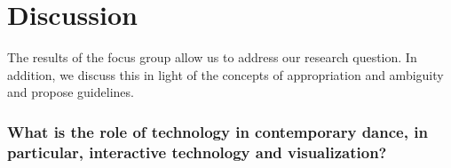 


\section{Discussion}

The results of the focus group allow us to address our research question. In addition, we  discuss this in light of the concepts of appropriation and ambiguity and propose guidelines.

\subsubsection{{ \textbf{What is the role of technology in contemporary dance, in particular, interactive technology and visualization}?}
}


